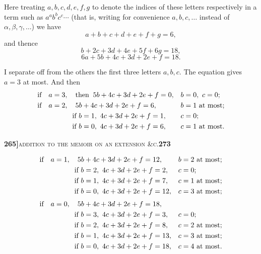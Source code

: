 \documentclass[11pt]{article}
\begin{document}
\noindent Here treating $a, b, c, d, e, f, g$ to denote the indices of these letters respectively in a term such as $a^a b^b c^c\cdots$ (that is, writing for convenience $a, b, c, \ldots$ instead of $\alpha, \beta, \gamma, \ldots$) we have
\[
   a + b + c + d + e + f + g = 6,
\]
and thence
\[
   b + 2 c + 3 d + 4 e + 5 f + 6 g = 18,
\]
\[
   6 a + 5 b + 4 c + 3 d + 2 e + f = 18.
\]

\medskip

\noindent I separate off from the others the first three letters $a, b, c$. The equation gives $a = 3$ at most. And then
\begin{align*}
   \text{if}\quad a &= 3,\quad\text{then}\;\; 5 b + 4 c + 3 d + 2 e + f = 0,& b &= 0,\ c = 0;\\
   \text{if}\quad a &= 2,\quad 5 b + 4 c + 3 d + 2 e + f = 6,& b &= 1\text{ at most};\\
   &\hphantom{= 2,\quad}\text{if}\ b = 1,\ 4 c + 3 d + 2 e + f = 1,& c &= 0;\\
   &\hphantom{= 2,\quad}\text{if}\ b = 0,\ 4 c + 3 d + 2 e + f = 6,& c &= 1\text{ at most}.
\end{align*}

\newpage
\setcounter{page}{273}

\noindent\textbf{265]}\hfill\textsc{addition to the memoir on an extension \&c.}\hfill\textbf{273}

\medskip

\noindent
\begin{align*}
   \text{if}\quad a &= 1,\quad 5 b + 4 c + 3 d + 2 e + f = 12,& b &= 2\text{ at most};\\
   &\hphantom{= 1,\quad}\text{if}\ b = 2,\ 4 c + 3 d + 2 e + f = 2,& c &= 0;\\
   &\hphantom{= 1,\quad}\text{if}\ b = 1,\ 4 c + 3 d + 2 e + f = 7,& c &= 1\text{ at most};\\
   &\hphantom{= 1,\quad}\text{if}\ b = 0,\ 4 c + 3 d + 2 e + f = 12,& c &= 3\text{ at most};\\[3pt]
   \text{if}\quad a &= 0,\quad 5 b + 4 c + 3 d + 2 e + f = 18,& & \\
   &\hphantom{= 0,\quad}\text{if}\ b = 3,\ 4 c + 3 d + 2 e + f = 3,& c &= 0;\\
   &\hphantom{= 0,\quad}\text{if}\ b = 2,\ 4 c + 3 d + 2 e + f = 8,& c &= 2\text{ at most};\\
   &\hphantom{= 0,\quad}\text{if}\ b = 1,\ 4 c + 3 d + 2 e + f = 13,& c &= 3\text{ at most};\\
   &\hphantom{= 0,\quad}\text{if}\ b = 0,\ 4 c + 3 d + 2 e + f = 18,& c &= 4\text{ at most}.
\end{align*}
\end{document}
